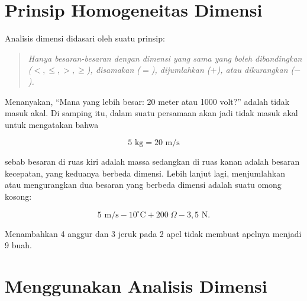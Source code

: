 \documentclass[12pt, a4paper]{article}\usepackage[utf8]{inputenc}
\theoremstyle{plain}
\theoremstyle{plain}
\numberwithin{equation}{section}
\theoremstyle{definition}
\begin{document}
	
	\section{Prinsip Homogeneitas Dimensi}
	
	Analisis dimensi didasari oleh suatu prinsip:
	
	\begin{quote}
		\emph{Hanya besaran-besaran dengan dimensi yang sama yang boleh dibandingkan ($<, \leq, >, \geq$), disamakan ($=$), dijumlahkan ($+$), atau dikurangkan ($-$).}
	\end{quote}
	
	Menanyakan, ``Mana yang lebih besar: 20 meter atau 1000 volt?'' adalah tidak masuk akal. Di samping itu, dalam suatu persamaan akan jadi tidak masuk akal untuk mengatakan bahwa
	
	\vspace{-.5em}
	\begin{equation*}
		5 \text{ kg} = 20 \text{ m/s}
	\end{equation*}
	
	sebab besaran di ruas kiri adalah massa sedangkan di ruas kanan adalah besaran kecepatan, yang keduanya berbeda dimensi.  Lebih lanjut lagi, menjumlahkan atau mengurangkan dua besaran yang berbeda dimensi adalah suatu omong kosong:
	
	\vspace{-.5em}
	\begin{equation*}
		5 \text{ m/s} - 10^\circ \text{C} + 200  \ \Omega - 3,5 \text{ N}.
	\end{equation*}
	
	Menambahkan 4 anggur dan 3 jeruk pada 2 apel tidak membuat apelnya menjadi 9 buah.
	
	\section{Menggunakan Analisis Dimensi}
	
\end{document}
